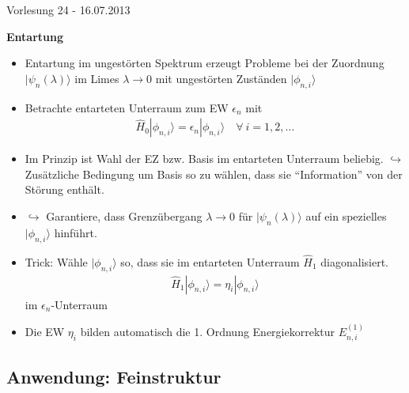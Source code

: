 \documentclass[10pt,article,colorback,accentcolor=tud9d]{scrartcl}
\begin{document}
\begin{flushright}
Vorlesung 24 - 16.07.2013
\end{flushright}

\noindent\textbf{Entartung}


\begin{itemize}
	\item Entartung im ungestörten Spektrum erzeugt Probleme bei der Zuordnung $|\psi_n(\lambda)\rangle$ im Limes $\lambda\rightarrow0$ mit ungestörten Zuständen $|\phi_{n,i}\rangle$
  \item Betrachte entarteten Unterraum zum EW $\epsilon_n$ mit 
    \begin{align}
    \hat{H}_0|\phi_{n,i}\rangle=\epsilon_n|\phi_{n,i}\rangle\quad\forall\ i=1,2,...
    \end{align}
  \item Im Prinzip ist Wahl der EZ bzw. Basis im entarteten Unterraum beliebig.
    $\hookrightarrow$ Zusätzliche Bedingung um Basis so zu wählen, dass sie "`Information"' von der Störung enthält.
  \item $\hookrightarrow$ Garantiere, dass Grenzübergang $\lambda\rightarrow0$ für $|\psi_n(\lambda)\rangle$ auf ein spezielles $|\phi_{n,i}\rangle$ hinführt.
  \item Trick: Wähle $|\phi_{n,i}\rangle$ so, dass sie im entarteten Unterraum $\hat{H}_1$ diagonalisiert.
    \begin{align}
    \hat{H}_1|\phi_{n,i}\rangle=\eta_i|\phi_{n,i}\rangle
    \end{align}
    im $\epsilon_n$-Unterraum
  \item Die EW $\eta_i$ bilden automatisch die 1. Ordnung Energiekorrektur $E_{n,i}^{(1)}$
\end{itemize}

\subsection{Anwendung: Feinstruktur}
\end{document}
